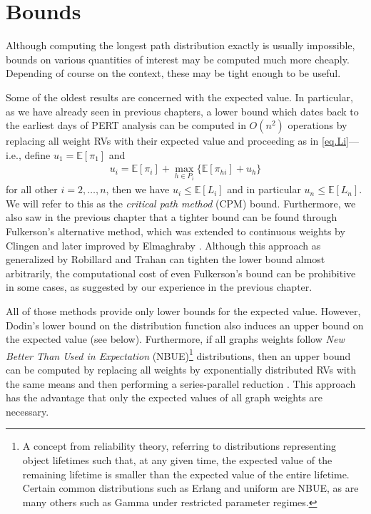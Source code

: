 \documentclass[12pt]{article}
\def\E{\mathbb{E}}
\begin{document}
\section{Bounds}
\label{sect.bounds}

Although computing the longest path distribution exactly is usually impossible, bounds on various quantities of interest may be computed much more cheaply. Depending of course on the context, these may be tight enough to be useful.

Some of the oldest results are concerned with the expected value. In particular, as we have already seen in previous chapters, a lower bound which dates back to the earliest days of PERT analysis can be computed in $O(n^2)$ operations by replacing all weight RVs with their expected value and proceeding as in \eqref{eq.Li}---i.e., define $u_1 = \E[\pi_1]$ and
\begin{align}
  \label{eq.ui}
  u_i = \E[\pi_i] + \max_{h \in P_i}\{ \E[\pi_{hi}] + u_h\}
\end{align}
for all other $i = 2, \dots, n$, then we have $u_i \leq \E[L_i]$ and in particular $u_n \leq \E[L_n]$. We will refer to this as the {\em critical path method} (CPM) bound. Furthermore, we also saw in the previous chapter that a tighter bound can be found through Fulkerson's \cite{ful62} alternative method, which was extended to continuous weights by Clingen \cite{cli64} and later improved by Elmaghraby \cite{elm67}. Although this approach as generalized by Robillard and Trahan \cite{rob76} can tighten the lower bound almost arbitrarily, the computational cost of even Fulkerson's bound can be prohibitive in some cases, as suggested by our experience in the previous chapter.    

All of those methods provide only lower bounds for the expected value. However, Dodin's lower bound on the distribution function also induces an upper bound on the expected value \cite{dod85} (see below).  Furthermore, if all graphs weights follow {\em New Better Than Used in Expectation} (NBUE)\footnote{A concept from reliability theory, referring to distributions representing object lifetimes such that, at any given time, the expected value of the remaining lifetime is smaller than the expected value of the entire lifetime. Certain common distributions such as Erlang and uniform are NBUE, as are many others such as Gamma under restricted parameter regimes.} distributions, then an upper bound can be computed by replacing all weights by exponentially distributed RVs with the same means and then performing a series-parallel reduction \cite{kam85a, yaz91}. This approach has the advantage that only the expected values of all graph weights are necessary. 
\end{document}
